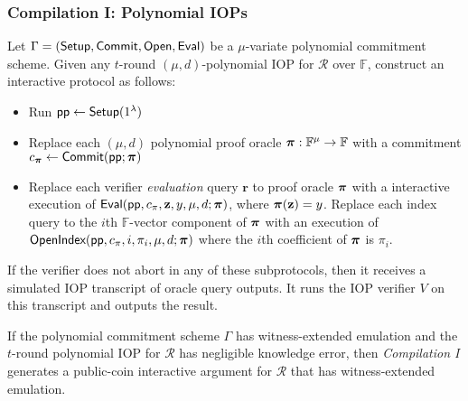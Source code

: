 \subsubsection*{Compilation I: Polynomial IOPs} 
Let $\Gamma = (\textsf{{Setup}}, \textsf{{Commit}}, \textsf{{Open}}, \textsf{{Eval}})$ be a $\mu$-variate polynomial commitment scheme. Given any $t$-round $(\mu, d)$-polynomial IOP for $\mathcal{R}$ over $\mathbb{F}$, construct an interactive protocol as follows: 
\begin{itemize}
\item Run $\textsf{pp} \leftarrow \textsf{{Setup}}(1^\lambda)$
\item Replace each $(\mu, d)$ polynomial proof oracle $\boldsymbol{\pi}: \mathbb{F}^\mu \rightarrow \mathbb{F}$ with a commitment $c_{\boldsymbol{\pi}} \leftarrow \textsf{{Commit}}(\textsf{pp}; \boldsymbol{\pi})$ 
\item Replace each verifier \emph{evaluation} query $\mathbf{r}$ to proof oracle $\boldsymbol{\pi}$ with a interactive execution of $\textsf{{Eval}}(\textsf{pp}, c_\pi, \mathbf{z}, y, \mu, d; \boldsymbol{\pi})$, where $\boldsymbol{\pi}(\mathbf{z}) = y$. Replace each index query to the $i$th $\mathbb{F}$-vector component of $\boldsymbol{\pi}$ with an execution of $\textsf{{OpenIndex}}(\textsf{pp}, c_\pi, i, \pi_i, \mu, d; \boldsymbol{\pi})$ where the $i$th coefficient of $\boldsymbol{\pi}$ is $\pi_i$. 
\end{itemize}

If the verifier does not abort in any of these subprotocols, then it receives a simulated IOP transcript of oracle query outputs. It runs the IOP verifier $V$ on this transcript and outputs the result. 


\begin{lemma}
If the polynomial commitment scheme $\Gamma$ has witness-extended emulation and the $t$-round polynomial IOP for $\mathcal{R}$ has negligible knowledge error, then \emph{Compilation I} generates a public-coin interactive argument for $\mathcal{R}$ that has witness-extended emulation. 
\end{lemma}


